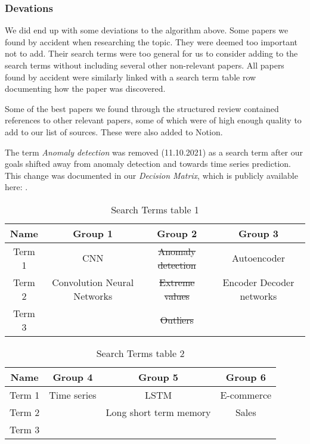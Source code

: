 \subsubsection{Devations}
We did end up with some deviations to the algorithm above.
Some papers we found by accident when researching the topic. 
They were deemed too important not to add.
Their search terms were too general for us to consider adding to the search terms without including several other non-relevant papers.
All papers found by accident were similarly linked with a search term table row documenting 
how the paper was discovered.

Some of the best papers we found through the structured review contained references to other relevant papers,
some of which were of high enough quality to add to our list of sources.
These were also added to Notion.

The term \textit{Anomaly detection} was removed (11.10.2021) as a search term after our goals shifted away from anomaly detection and towards time series prediction.
This change was documented in our \textit{Decision Matrix}, which is publicly available here:
\cite{decisionmatrix}.

\begin{table}[htbp]
    \begin{center}
        \begin{tabular}{|c|c|c|c|}\hline\hline
Name&Group 1&Group 2&Group 3\\ \hline
Term 1&CNN&\sout{Anomaly detection}&Autoencoder\\ \hline
Term 2&Convolution Neural Networks&\sout{Extreme values}&Encoder Decoder networks\\ \hline
Term 3&&\sout{Outliers}&  \\ \hline
        \end{tabular}
        \caption{Search Terms table 1}
        \label{tab:search-terms-table-1}
    \end{center}
\end{table}%

\begin{table}[htbp]
    \begin{center}
        \begin{tabular}{|c|c|c|c|}\hline\hline
Name &Group 4&Group 5&Group 6 \\ \hline
Term 1&Time series&LSTM&E-commerce \\ \hline
Term 2 &&Long short term memory&Sales \\ \hline
Term 3& &&\\ \hline 
        \end{tabular}
        \caption{Search Terms table 2}
    \label{tab:search-terms-table-2}
    \end{center}
\end{table}%

